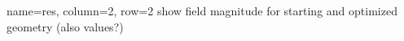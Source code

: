 \documentclass[
   accentcolor=9b,
   boxstyle=boxed
   ]{tudasciposter}
\begin{document}
\begin{tcbposter}[poster={columns=2, rows=8, spacing=1cm}]
\begin{posterboxenv}[title=Results]{name=res, column=2, row=2}
   show field magnitude for starting and optimized geometry (also values?)
\end{posterboxenv}

\end{tcbposter}
\end{document}
